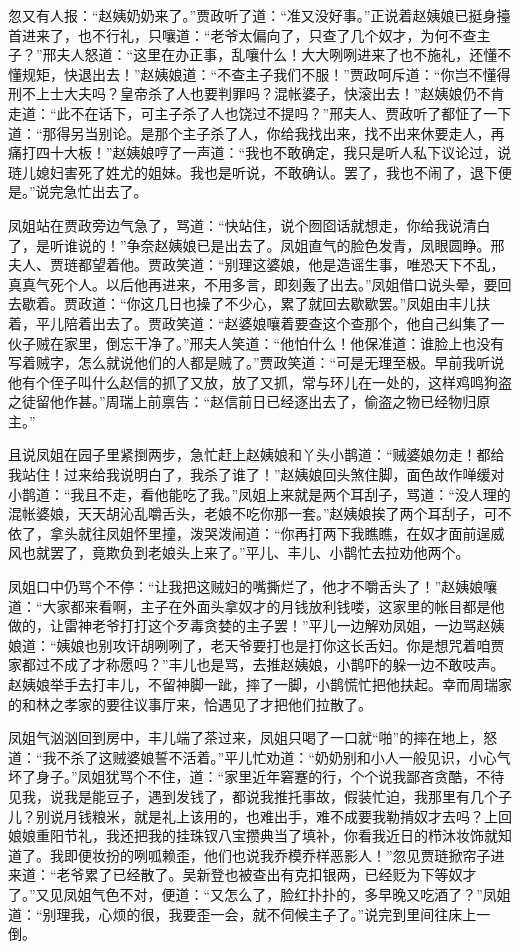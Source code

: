 \documentclass[12pt,oneside]{book}
\begin{document}
忽又有人报：“赵姨奶奶来了。”贾政听了道：“准又没好事。”正说着赵姨娘已挺身擡首进来了，也不行礼，只嚷道：“老爷太偏向了，只查了几个奴才，为何不查主子？”邢夫人怒道：“这里在办正事，乱嚷什么！大大咧咧进来了也不施礼，还懂不懂规矩，快退出去！”赵姨娘道：“不查主子我们不服！”贾政呵斥道：“你岂不懂得刑不上士大夫吗？皇帝杀了人也要判罪吗？混帐婆子，快滚出去！”赵姨娘仍不肯走道：“此不在话下，可主子杀了人也饶过不提吗？”邢夫人、贾政听了都怔了一下道：“那得另当别论。是那个主子杀了人，你给我找出来，找不出来休要走人，再痛打四十大板！”赵姨娘哼了一声道：“我也不敢确定，我只是听人私下议论过，说琏儿媳妇害死了姓尤的姐妹。我也是听说，不敢确认。罢了，我也不闹了，退下便是。”说完急忙出去了。

凤姐站在贾政旁边气急了，骂道：“快站住，说个囫囵话就想走，你给我说清白了，是听谁说的！”争奈赵姨娘已是出去了。凤姐直气的脸色发青，凤眼圆睁。邢夫人、贾琏都望着他。贾政笑道：“别理这婆娘，他是造谣生事，唯恐天下不乱，真真气死个人。以后他再进来，不用多言，即刻轰了出去。”凤姐借口说头晕，要回去歇着。贾政道：“你这几日也操了不少心，累了就回去歇歇罢。”凤姐由丰儿扶着，平儿陪着出去了。贾政笑道：“赵婆娘嚷着要查这个查那个，他自己纠集了一伙子贼在家里，倒忘干净了。”邢夫人笑道：“他怕什么！他保准道：谁脸上也没有写着贼字，怎么就说他们的人都是贼了。”贾政笑道：“可是无理至极。早前我听说他有个侄子叫什么赵信的抓了又放，放了又抓，常与环儿在一处的，这样鸡鸣狗盗之徒留他作甚。”周瑞上前禀告：“赵信前日已经逐出去了，偷盗之物已经物归原主。”

且说凤姐在园子里紧捯两步，急忙赶上赵姨娘和丫头小鹊道：“贼婆娘勿走！都给我站住！过来给我说明白了，我杀了谁了！”赵姨娘回头煞住脚，面色故作啴缓对小鹊道：“我且不走，看他能吃了我。”凤姐上来就是两个耳刮子，骂道：“没人理的混帐婆娘，天天胡沁乱嚼舌头，老娘不吃你那一套。”赵姨娘挨了两个耳刮子，可不依了，拿头就往凤姐怀里撞，泼哭泼闹道：“你再打两下我瞧瞧，在奴才面前逞威风也就罢了，竟欺负到老娘头上来了。”平儿、丰儿、小鹊忙去拉劝他两个。

凤姐口中仍骂个不停：“让我把这贼妇的嘴撕烂了，他才不嚼舌头了！”赵姨娘嚷道：“大家都来看啊，主子在外面头拿奴才的月钱放利钱喽，这家里的帐目都是他做的，让雷神老爷打打这个歹毒贪婪的主子罢！”平儿一边解劝凤姐，一边骂赵姨娘道：“姨娘也别攻讦胡咧咧了，老天爷要打也是打你这长舌妇。你是想咒着咱贾家都过不成了才称愿吗？”丰儿也是骂，去推赵姨娘，小鹊吓的躲一边不敢吱声。赵姨娘举手去打丰儿，不留神脚一跐，摔了一脚，小鹊慌忙把他扶起。幸而周瑞家的和林之孝家的要往议事厅来，恰遇见了才把他们拉散了。

凤姐气汹汹回到房中，丰儿端了茶过来，凤姐只喝了一口就“啪”的摔在地上，怒道：“我不杀了这贼婆娘誓不活着。”平儿忙劝道：“奶奶别和小人一般见识，小心气坏了身子。”凤姐犹骂个不住，道：“家里近年窘蹇的行，个个说我鄙吝贪酷，不待见我，说我是能豆子，遇到发钱了，都说我推托事故，假装忙迫，我那里有几个子儿？别说月钱粮米，就是礼上该用的，也难出手，难不成要我勒掯奴才去吗？上回娘娘重阳节礼，我还把我的挂珠钗八宝攒典当了填补，你看我近日的栉沐妆饰就知道了。我即便妆扮的咧呱赖歪，他们也说我乔模乔样恶影人！”忽见贾琏掀帘子进来道：“老爷累了已经散了。吴新登也被查出有克扣银两，已经贬为下等奴才了。”又见凤姐气色不对，便道：“又怎么了，脸红扑扑的，多早晚又吃酒了？”凤姐道：“别理我，心烦的很，我要歪一会，就不伺候主子了。”说完到里间往床上一倒。
\end{document}

